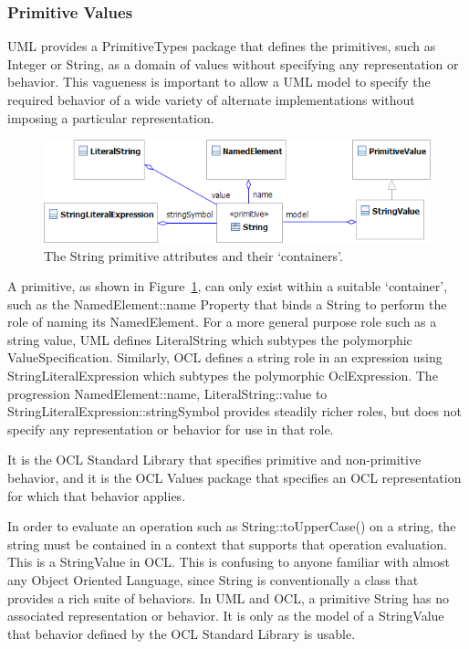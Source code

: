 \documentclass{eceasst}
\begin{document}
\subsubsection{Primitive Values}

UML provides a PrimitiveTypes package that defines the primitives, such as Integer or String, as a domain of values without specifying any representation or behavior. This vagueness is important to allow a UML model to specify the required behavior of a wide variety of alternate implementations without imposing a particular representation.

\begin{figure}
  \begin{center}
    \includegraphics[width=5.75in]{String.png}
  \end{center}
  \caption{The String primitive attributes and their `containers'.}
  \label{fig:String}
\end{figure}

A primitive, as shown in Figure~\ref{fig:String}, can only exist within a suitable `container', such as the NamedElement::name Property that binds a String to perform the role of naming its NamedElement.  For a more general purpose role such as a string value, UML defines LiteralString which subtypes the polymorphic ValueSpecification. Similarly, OCL defines a string role in an expression using StringLiteralExpression which subtypes the polymorphic OclExpression. The progression NamedElement::name, LiteralString::value to StringLiteralExpression::stringSymbol provides steadily richer roles, but does not specify any representation or behavior for use in that role.

 It is the OCL Standard Library that specifies primitive and non-primitive behavior, and it is the OCL Values package that specifies an OCL representation for which that behavior applies. 

In order to evaluate an operation such as String::toUpperCase() on a string, the string must be contained in a context that supports that operation evaluation. This is a StringValue in OCL. This is confusing to anyone familiar with almost any Object Oriented Language, since String is conventionally a class that provides a rich suite of behaviors. In UML and OCL, a primitive String has no associated representation or behavior. It  is only as the model of a StringValue that behavior defined by the OCL Standard Library is usable.
\end{document}
